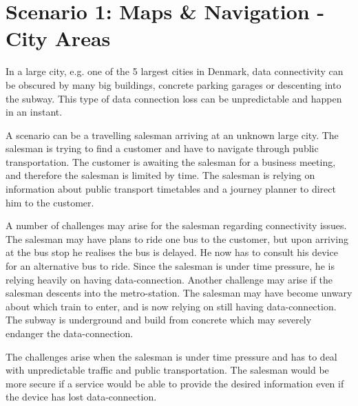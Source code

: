 \section{Scenario 1: Maps \& Navigation - City Areas}
In a large city, e.g. one of the 5 largest cities in Denmark, data connectivity can be obscured by many big buildings, concrete parking garages or descenting into the subway. This type of data connection loss can be unpredictable and happen in an instant. 

A scenario can be a travelling salesman arriving at an unknown large city. The salesman is trying to find a customer and have to navigate through public transportation. The customer is awaiting the salesman for a business meeting, and therefore the salesman is limited by time. The salesman is relying on information about public transport timetables and a journey planner to direct him to the customer. 

A number of challenges may arise for the salesman regarding connectivity issues. The salesman may have plans to ride one bus to the customer, but upon arriving at the bus stop he realises the bus is delayed. He now has to consult his device for an alternative bus to ride. Since the salesman is under time pressure, he is relying heavily on having data-connection. Another challenge may arise if the salesman descents into the metro-station. The salesman may have become unwary about which train to enter, and is now relying on still having data-connection. The subway is underground and build from concrete which may severely endanger the data-connection. 

The challenges arise when the salesman is under time pressure and has to deal with unpredictable traffic and public transportation. The salesman would be more secure if a service would be able to provide the desired information even if the device has lost data-connection.
